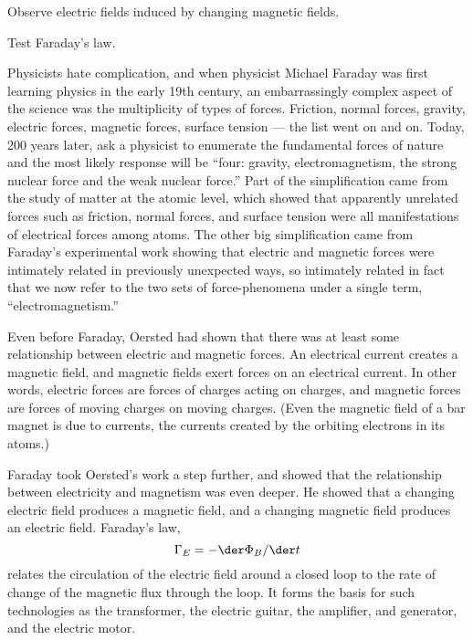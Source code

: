 \label{lab:faraday}

\apparatus
{}

\begin{goals}

\item[] Observe electric fields induced by changing magnetic fields.

\item[] Test Faraday's law.
\end{goals}

\introduction

Physicists hate complication, and when physicist Mi\-ch\-a\-el
Faraday was first learning physics in the early 19th
century, an embarrassingly complex aspect of the science was
the multiplicity of types of forces. Friction, normal
forces, gravity, electric forces, magnetic forces, surface
tension --- the list went on and on. Today, 200 years later,
ask a physicist to enumerate the fundamental forces of
nature and the most likely response will be ``four: gravity,
electromagnetism, the strong nuclear force and the weak
nuclear force.'' Part of the simplification came from the
study of matter at the atomic level, which showed that
apparently unrelated forces such as friction, normal forces,
and surface tension were all manifestations of electrical
forces among atoms. The other big simplification came from
Faraday's experimental work showing that electric and
magnetic forces were intimately related in previously
unexpected ways, so intimately related in fact that we now
refer to the two sets of force-phenomena under a single
term, ``electromagnetism.''

Even before Faraday, Oersted had shown that there was at
least some relationship between electric and magnetic
forces. An electrical current creates a magnetic field, and
magnetic fields exert forces on an electrical current. In
other words, electric forces are forces of charges acting on
charges, and magnetic forces are forces of moving charges on
moving charges. (Even the magnetic field of a bar magnet is
due to currents, the currents created by the orbiting
electrons in its atoms.)

Faraday took Oersted's work a step further, and showed that
the relationship between electricity and magnetism was even
deeper. He showed that a changing electric field produces a
magnetic field, and a changing magnetic field produces an
electric field. Faraday's law,
\begin{equation*}
      \Gamma_E  =  -\der\Phi_B/\der t  
\end{equation*}
relates the circulation of the electric field around a
closed loop to the rate of change of the magnetic flux
through the loop. It forms the basis for such technologies
as the transformer, the electric guitar, the amplifier, and
generator, and the electric motor.

